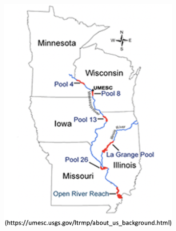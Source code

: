 \documentclass[preprint,review,12pt,authoryear]{elsarticle}
\providecommand{\DIFaddbeginFL}{} %
\providecommand{\DIFaddendFL}{} %
\providecommand{\DIFdelbeginFL}{} %
\providecommand{\DIFdelendFL}{} %
\begin{document}
\begin{figure}
\centering
\DIFdelbeginFL %
\DIFdelendFL \DIFaddbeginFL \begin{subfigure}[b]{.3\textwidth}  
  \includegraphics[width=\textwidth]{figures/field_stations.png}
  \DIFaddendFL \caption{}
  \label{fig:field_stations}
\end{subfigure}
\DIFdelbeginFL %
\DIFdelendFL \DIFaddbeginFL \begin{subfigure}[b]{.68\textwidth} 

\end{subfigure}
\end{figure}
\end{document}
